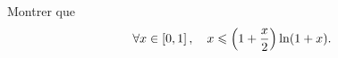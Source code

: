 \documentclass{magnoliaold}
\begin{document}
\begin{exoUnique}
\exo Montrer que
  \[\forall x\in\left[0,1\right],\quad x\leqslant \left(1+\frac{x}{2}\right)\ln(1+x).\]
\end{exoUnique}
\end{document}
